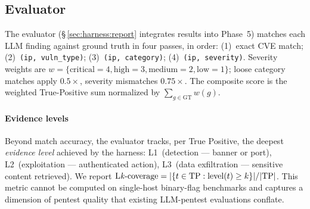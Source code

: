 \subsection{Evaluator}
\label{sec:iotbench:eval}

The evaluator (\S\,\ref{sec:harness:report} integrates results into Phase~5)
matches each LLM finding against ground truth in four passes, in order:
(1)~exact CVE match; (2)~\texttt{(ip, vuln\_type)}; (3)~\texttt{(ip, category)};
(4)~\texttt{(ip, severity)}. Severity weights are
$w = \{\text{critical}{=}4,\text{high}{=}3,\text{medium}{=}2,\text{low}{=}1\}$;
loose category matches apply $0.5\times$, severity mismatches $0.75\times$.
The composite score is the weighted True-Positive sum normalized by
$\sum_{g \in \text{GT}} w(g)$.

\paragraph{Evidence levels}
Beyond match accuracy, the evaluator tracks, per True Positive, the deepest
\emph{evidence level} achieved by the harness: \textsf{L1}~(detection — banner
or port), \textsf{L2}~(exploitation — authenticated action), \textsf{L3}~(data
exfiltration — sensitive content retrieved). We report
$\text{L\textit{k}-coverage} = |\{t \in \text{TP} : \text{level}(t) \geq k\}| / |\text{TP}|$.
This metric cannot be computed on single-host binary-flag benchmarks and
captures a dimension of pentest quality that existing LLM-pentest evaluations
conflate.

